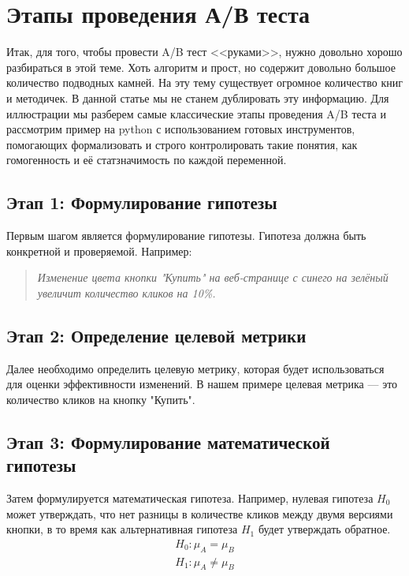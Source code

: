     \section*{Этапы проведения А/В теста}

        Итак, для того, чтобы провести A/B тест <<руками>>, нужно довольно хорошо разбираться в этой теме.
        Хоть алгоритм и прост, но содержит довольно большое количество подводных камней.
        На эту тему существует огромное количество книг и методичек.
        В данной статье мы не станем дублировать эту информацию.
        Для иллюстрации мы разберем самые классические этапы проведения A/B теста и рассмотрим пример на python с использованием готовых инструментов, помогающих формализовать и строго контролировать такие понятия, как гомогенность и её статзначимость по каждой переменной.

        \subsection*{Этап 1: Формулирование гипотезы}

        Первым шагом является формулирование гипотезы.
        Гипотеза должна быть конкретной и проверяемой.
        Например:
        \begin{quote}
            \textit{Изменение цвета кнопки "Купить" на веб-странице с синего на зелёный увеличит количество кликов на 10\%.}
        \end{quote}

        \subsection*{Этап 2: Определение целевой метрики}

        Далее необходимо определить целевую метрику, которая будет использоваться для оценки эффективности изменений.
        В нашем примере целевая метрика --- это количество кликов на кнопку "Купить".

        \subsection*{Этап 3: Формулирование математической гипотезы}

        Затем формулируется математическая гипотеза.
        Например, нулевая гипотеза $H_0$ может утверждать, что нет разницы в количестве кликов между двумя версиями кнопки, в то время как альтернативная гипотеза $H_1$ будет утверждать обратное.
        \begin{align*}
            H_0: \mu_A = \mu_B \\
            H_1: \mu_A \neq \mu_B
        \end{align*}

